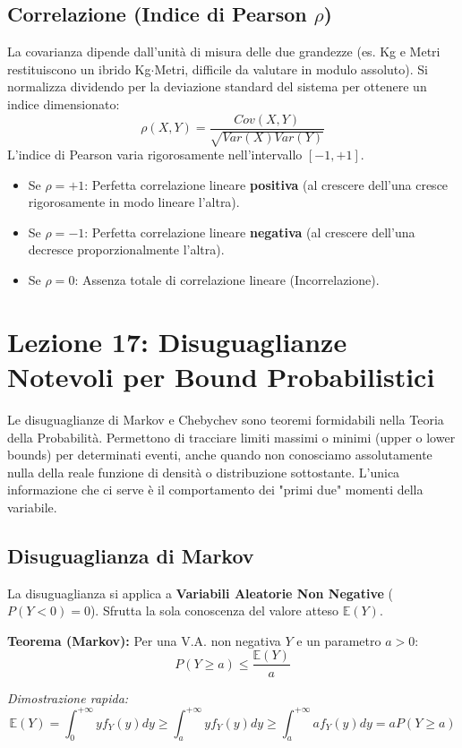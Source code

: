 \documentclass[12pt, a4paper]{article}
\begin{document}
\subsection{Correlazione (Indice di Pearson \texorpdfstring{$\rho$}{rho})}
La covarianza dipende dall'unità di misura delle due grandezze (es. Kg e Metri restituiscono un ibrido Kg$\cdot$Metri, difficile da valutare in modulo assoluto). Si normalizza dividendo per la deviazione standard del sistema per ottenere un indice dimensionato:
$$ \rho(X,Y) = \frac{Cov(X,Y)}{\sqrt{Var(X)Var(Y)}} $$
L'indice di Pearson varia rigorosamente nell'intervallo \textbf{$[-1, +1]$}.
\begin{itemize}
    \item Se $\rho = +1$: Perfetta correlazione lineare \textbf{positiva} (al crescere dell'una cresce rigorosamente in modo lineare l'altra).
    \item Se $\rho = -1$: Perfetta correlazione lineare \textbf{negativa} (al crescere dell'una decresce proporzionalmente l'altra).
    \item Se $\rho = 0$: Assenza totale di correlazione lineare (Incorrelazione).
\end{itemize}


\section{Lezione 17: Disuguaglianze Notevoli per Bound Probabilistici}

Le disuguaglianze di Markov e Chebychev sono teoremi formidabili nella Teoria della Probabilità. Permettono di tracciare limiti massimi o minimi (upper o lower bounds) per determinati eventi, anche quando non conosciamo assolutamente nulla della reale funzione di densità o distribuzione sottostante. L'unica informazione che ci serve è il comportamento dei "primi due" momenti della variabile.

\newpage

\subsection{Disuguaglianza di Markov}
La disuguaglianza si applica a \textbf{Variabili Aleatorie Non Negative} ($P(Y < 0) = 0$). Sfrutta la sola conoscenza del valore atteso $\mathbb{E}(Y)$.

\textbf{Teorema (Markov):} Per una V.A. non negativa $Y$ e un parametro $a > 0$:
$$ P(Y \ge a) \le \frac{\mathbb{E}(Y)}{a} $$

\textit{Dimostrazione rapida:}
$$ \mathbb{E}(Y) = \int_0^{+\infty} y f_Y(y) dy \ge \int_a^{+\infty} y f_Y(y) dy \ge \int_a^{+\infty} a f_Y(y) dy = a P(Y \ge a) $$
\end{document}
